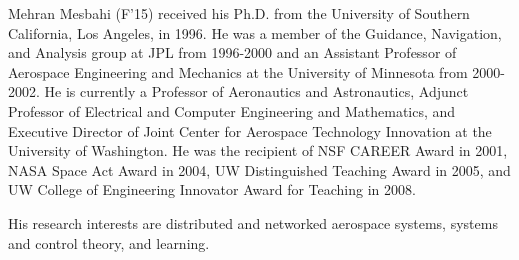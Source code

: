 \documentclass[journal]{IEEEtran}
\theoremstyle{definition}
\theoremstyle{remark}
\begin{document}
\begin{IEEEbiography}{Mehran Mesbahi}
    (F'15) received his Ph.D. from the University of Southern California, Los Angeles, in 1996. He was a member of the Guidance, Navigation, and Analysis group at JPL from 1996-2000 and an Assistant Professor of Aerospace Engineering and Mechanics at the University of Minnesota from 2000-2002.
    He is currently a Professor of Aeronautics and Astronautics, Adjunct Professor of Electrical and Computer Engineering and Mathematics, and Executive Director of Joint Center for Aerospace Technology Innovation at the
    University of Washington.
    He was the recipient of NSF CAREER Award in 2001, NASA Space Act Award in 2004, UW Distinguished Teaching Award in 2005, and UW College of Engineering Innovator Award for Teaching in 2008.
    
    His research interests are distributed and networked aerospace systems, systems and control theory, and learning.
\end{IEEEbiography}







\end{document}
